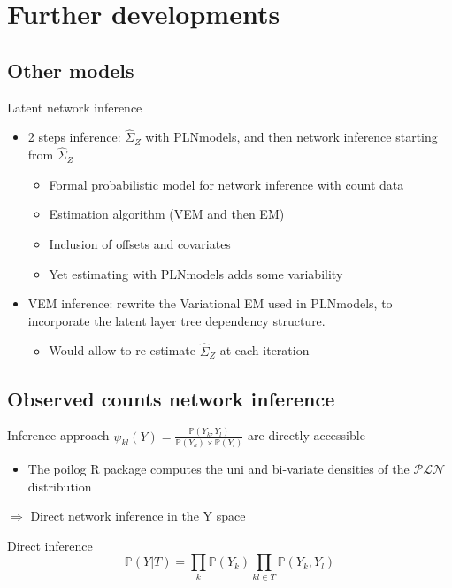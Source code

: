 \documentclass[9pt]{beamer}
\newcommand{\emphase}[1]{\textcolor{Complement}{#1}}
\begin{document}
\section{Further developments}
\subsection{Other models}
\begin{frame}{Latent network inference}
\large{
    \begin{itemize}
        \item 2 steps inference: $\hat{\Sigma}_Z$ with {\selectfont
PLNmodels}, and then network inference starting from $\hat{\Sigma}_Z$
\begin{itemize}
	\item Formal probabilistic model for network inference with \emphase{count data}
	\item  Estimation algorithm (VEM and then EM)
	\item Inclusion of \emphase{offsets} and \emphase{covariates}
    \item Yet estimating with
{\selectfont
PLNmodels} adds some variability \bigskip
        \end{itemize}
        \item VEM inference: rewrite the Variational EM used in {\selectfont
PLNmodels}, to incorporate the latent layer tree dependency structure.
         \begin{itemize}
             \item Would allow to re-estimate  $\hat{\Sigma}_Z$ at each iteration
         \end{itemize}
         
    \end{itemize}}
\end{frame}
\subsection{Observed counts network inference}
\begin{frame}{Inference approach }
  \large{$\psi_{kl}(Y) = \frac{\mathds{P}(Y_k,Y_l)}{\mathds{P}(Y_k)\times \mathds{P}(Y_l)} $} \normalsize are \emphase{directly accessible} \vspace{0.5cm}
    \begin{itemize}
        \item The {\selectfont
poilog} R package computes the uni and bi-variate densities of the $\mathcal{PLN}$ distribution 
    \end{itemize}


\begin{center}
    $\Rightarrow$ Direct network inference in the Y space\\
\end{center}
\begin{block}{Direct inference}
\[\mathds{P}(Y|T) = \prod_k \mathds{P}(Y_k) \prod_{kl \in T} \mathds{P}(Y_k,Y_l)\]

\end{block}

\end{frame}
\end{document}

